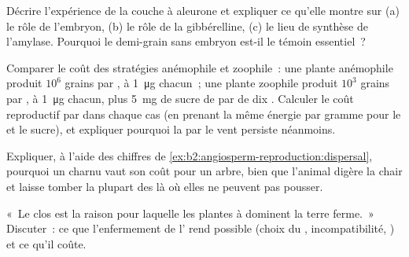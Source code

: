 \begin{exercise}[$\star\star$]\label{exo:b2:angiosperm-reproduction:9}
Décrire l'expérience de la couche à aleurone et expliquer ce qu'elle
montre sur (a) le rôle de l'embryon, (b) le rôle de la gibbérelline,
(c) le lieu de synthèse de l'amylase. Pourquoi le demi-grain sans
embryon est-il le témoin essentiel~?
\end{exercise}

\begin{exercise}[$\star\star\star$]\label{exo:b2:angiosperm-reproduction:10}
Comparer le coût des stratégies anémophile et zoophile~: une plante
anémophile produit $10^{6}$ grains par , à \qty{1}{\micro g}
chacun~; une plante zoophile produit $10^{3}$ grains par , à
\qty{1}{\micro g} chacun, plus \qty{5}{mg} de sucre de  par 
de dix . Calculer le coût reproductif par  dans chaque cas
(en prenant la même énergie par gramme pour le  et le sucre), et
expliquer pourquoi la  par le vent persiste néanmoins.
\end{exercise}

\begin{exercise}[$\star\star\star$]\label{exo:b2:angiosperm-reproduction:11}
Expliquer, à l'aide des chiffres de \cref{ex:b2:angiosperm-reproduction:dispersal},
pourquoi un  charnu vaut son coût pour un arbre, bien que l'animal
digère la chair et laisse tomber la plupart des  là où elles ne
peuvent pas pousser.
\end{exercise}

\begin{exercise}[$\star\star\star$]\label{exo:b2:angiosperm-reproduction:12}
«~Le  clos est la raison pour laquelle les plantes à 
dominent la terre ferme.~» Discuter~: ce que l'enfermement de l'
rend possible (choix du , incompatibilité, ) et ce qu'il
coûte.
\end{exercise}


